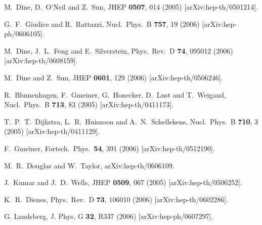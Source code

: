 \documentclass[aps,amsfonts]{ar2e}
\begin{document}
\begin{thebibliography}{999}
  M.~Dine, D.~O'Neil and Z.~Sun,
  JHEP {\bf 0507}, 014 (2005)
  [arXiv:hep-th/0501214].

  G.~F.~Giudice and R.~Rattazzi,
  Nucl.\ Phys.\ B {\bf 757}, 19 (2006)
  [arXiv:hep-ph/0606105].

  M.~Dine, J.~L.~Feng and E.~Silverstein,
  Phys.\ Rev.\ D {\bf 74}, 095012 (2006)
  [arXiv:hep-th/0608159].

  M.~Dine and Z.~Sun,
  JHEP {\bf 0601}, 129 (2006)
  [arXiv:hep-th/0506246].

  R.~Blumenhagen, F.~Gmeiner, G.~Honecker, D.~Lust and T.~Weigand,
  Nucl.\ Phys.\ B {\bf 713}, 83 (2005)
  [arXiv:hep-th/0411173].

  T.~P.~T.~Dijkstra, L.~R.~Huiszoon and A.~N.~Schellekens,
  Nucl.\ Phys.\ B {\bf 710}, 3 (2005)
  [arXiv:hep-th/0411129].

  F.~Gmeiner,
  Fortsch.\ Phys.\  {\bf 54}, 391 (2006)
  [arXiv:hep-th/0512190].

  M.~R.~Douglas and W.~Taylor,
  arXiv:hep-th/0606109.

  J.~Kumar and J.~D.~Wells,
  JHEP {\bf 0509}, 067 (2005)
  [arXiv:hep-th/0506252].

  K.~R.~Dienes,
  Phys.\ Rev.\ D {\bf 73}, 106010 (2006)
  [arXiv:hep-th/0602286].

G. Landsberg, J. Phys. G {\bf 32}, R337 (2006)
[arXiv:hep-ph/0607297].



\end{thebibliography}
\end{document}
